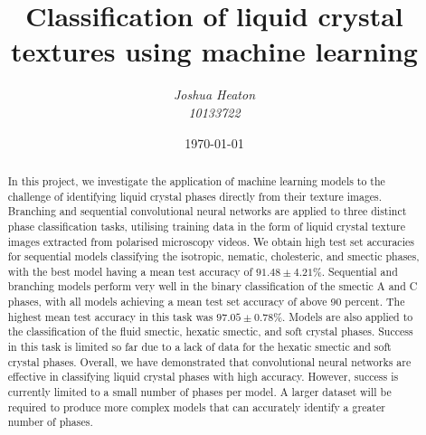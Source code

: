 \documentclass[12pt]{article}
\begin{document}
\title{Classification of liquid crystal textures using machine learning}
\author{\textit{Joshua Heaton}\\\textit{10133722}}
\date{\today}

\maketitle

\begin{abstract}
In this project, we investigate the application of machine learning models to the challenge of identifying liquid crystal phases directly from their texture images. Branching and sequential convolutional neural networks are applied to three distinct phase classification tasks, utilising training data in the form of liquid crystal texture images extracted from polarised microscopy videos. We obtain high test set accuracies for sequential models classifying the isotropic, nematic, cholesteric, and smectic phases, with the best model having a mean test accuracy of $91.48\pm4.21$\%. Sequential and branching models perform very well in the binary classification of the smectic A and C phases, with all models achieving a mean test set accuracy of above 90 percent. The highest mean test accuracy in this task was $97.05\pm0.78$\%. Models are also applied to the classification of the fluid smectic, hexatic smectic, and soft crystal phases. Success in this task is limited so far due to a lack of data for the hexatic smectic and soft crystal phases. Overall, we have demonstrated that convolutional neural networks are effective in classifying liquid crystal phases with high accuracy. However, success is currently limited to a small number of phases per model. A larger dataset will be required to produce more complex models that can accurately identify a greater number of phases.
\end{abstract}

\newpage
\tableofcontents

\newpage
{}

\end{document}
